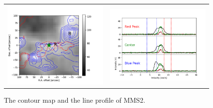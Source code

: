 \begin{figure}[h!]
	\begin{center}
		\begin{tabular}{cc}
			\includegraphics[width=7cm]{Orion_12CO2-1_MMS2_rbcontour_400_modified.png} &   \includegraphics[width=7cm]{Orion_12CO2-1_MMS2_line_profile_400.png} \\
		\end{tabular}
		\label{MMS221}
		\caption{The contour map and the line profile of MMS2. }
	\end{center}
\end{figure}

